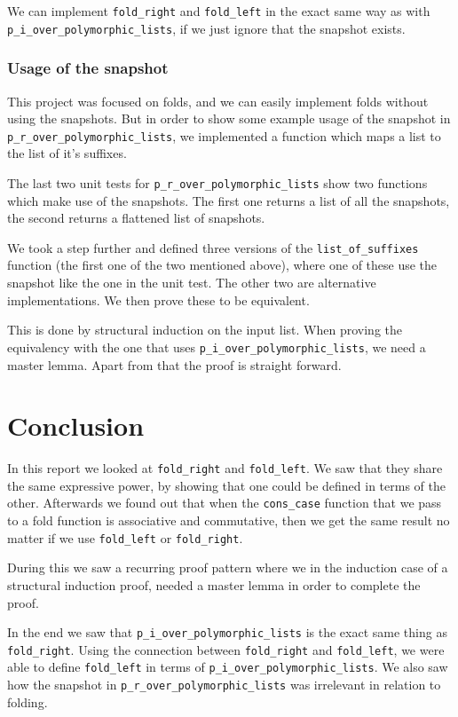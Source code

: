 \documentclass[a4paper]{article}
\begin{document}
We can implement \texttt{fold\_right} and \texttt{fold\_left} in the exact same
way as with \texttt{p\_i\_over\_polymorphic\_lists}, if we just ignore that the
snapshot exists.

\subsubsection{Usage of the snapshot}
This project was focused on folds, and we can easily implement folds without
using the snapshots. But in order to show some example usage of the snapshot in
\texttt{p\_r\_over\_polymorphic\_lists}, we implemented a function which maps a
list to the list of it's suffixes.

The last two unit tests for \texttt{p\_r\_over\_polymorphic\_lists} show two
functions which make use of the snapshots. The first one returns a list of all
the snapshots, the second returns a flattened list of snapshots. 

We took a step further and defined three versions of the
\texttt{list\_of\_suffixes} function (the first one of the two mentioned
above), where one of these use the snapshot like the one in the unit test. The
other two are alternative implementations. We then prove these to be
equivalent.

This is done by structural induction on the input list. When proving the
equivalency with the one that uses \texttt{p\_i\_over\_polymorphic\_lists}, we
need a master lemma. Apart from that the proof is straight forward.

\section{Conclusion}
In this report we looked at \texttt{fold\_right} and \texttt{fold\_left}. We
saw that they share the same expressive power, by showing that one could be
defined in terms of the other. Afterwards we found out that when the
\texttt{cons\_case} function that we pass to a fold function is associative and
commutative, then we get the same result no matter if we use
\texttt{fold\_left} or \texttt{fold\_right}. 

During this we saw a recurring proof pattern where we in the induction case of a
structural induction proof, needed a master lemma in order to complete the
proof.

In the end we saw that \texttt{p\_i\_over\_polymorphic\_lists} is the exact
same thing as \texttt{fold\_right}. Using the connection between
\texttt{fold\_right} and \texttt{fold\_left}, we were able to define \texttt{fold\_left} in terms
of \texttt{p\_i\_over\_polymorphic\_lists}. We also saw how the snapshot in \texttt{p\_r\_over\_polymorphic\_lists} was
irrelevant in relation to folding.

\printbibliography[heading=bibnumbered]{}
\end{document}
